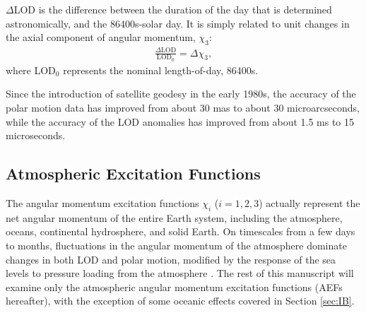 \documentclass[draft,jgrga]{agutex}
\begin{document}
\begin{article}
$\Delta$LOD is the difference between the duration of the day that is determined astronomically, and the 86400s-solar day.
It is simply related to unit changes in the axial component of angular momentum, $\chi_3$:
\begin{eqnarray}
\frac{\Delta \text{LOD}}{ \text{LOD}_0 } = \Delta \chi_3,
\label{eq:LOD_to_AEF}
\end{eqnarray}
where LOD$_0$  {represents the nominal length-of-day, 86400s}.

 {Since the introduction of satellite geodesy in the early 1980s, the accuracy of the polar motion data has improved from about 30 mas to about 30 microarcseconds, while the accuracy of the LOD anomalies has improved from about 1.5 ms to 15 microseconds.} 
\subsection{Atmospheric Excitation Functions}

 {The angular momentum excitation functions}  $\chi_i$ ($i=1,2,3$)  {actually represent the net angular momentum of the entire Earth system, including the atmosphere, oceans, continental hydrosphere, and solid Earth.
On timescales from a few days to months, fluctuations in the angular momentum of the atmosphere dominate changes in both LOD} \citep{Rosen1983, Rosen1990}  {and polar motion, modified by the response of the sea levels to pressure loading from the atmosphere} \citep{Eubanks1988}.
 {The rest of this manuscript will examine only the atmospheric angular momentum excitation functions (AEFs hereafter), with the exception of some oceanic effects covered in Section} \ref{sec:IB}.


\end{article}
\end{document}
